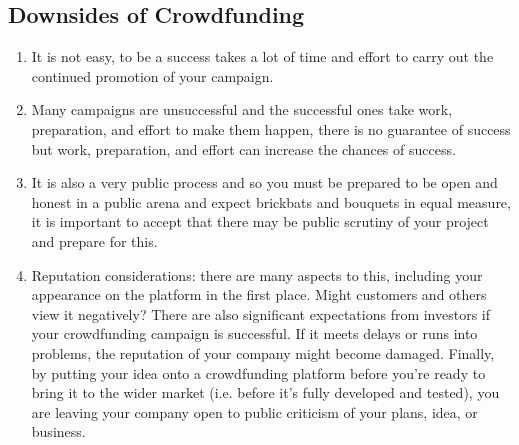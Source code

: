 \subsection*{ Downsides of Crowdfunding}
\begin{enumerate}
      \item It is not easy, to be a success takes a lot of time and effort to carry out the continued promotion of your campaign.
      \item Many campaigns are unsuccessful and the successful ones take work, preparation, and effort to make them happen, there is no guarantee of success but work, preparation, and effort can increase the chances of success.
      \item It is also a very public process and so you must be prepared to be open and honest in a public arena and expect brickbats and bouquets in equal measure, it is important to accept that there may be public scrutiny of your project and prepare for this.
      \item Reputation considerations: there are many aspects to this, including your appearance on the platform in the first place. Might customers and others view it negatively? There are also significant expectations from investors if your crowdfunding campaign is successful. If it meets delays or runs into problems, the reputation of your company might become damaged. Finally, by putting your idea onto a crowdfunding platform before you’re ready to bring it to the wider market (i.e. before it’s fully developed and tested), you are leaving your company open to public criticism of your plans, idea, or business.
\end{enumerate}



